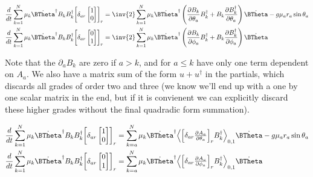 \begin{align}\label{eqn:multiPendulumSpherical2:boo6}
\frac{d}{dt}
\sum_{k=1}^N \mu_k
\dot{\BTheta}^\dagger 
B_k B_k^\dagger 
{\begin{bmatrix}
\delta_{ar}
\begin{bmatrix}
1 \\
0
\end{bmatrix}
\end{bmatrix}}_r
&=
\inv{2} \sum_{k=1}^N \mu_k
\dot{\BTheta}^\dagger 
\left(
\PD{\theta_a}{B_k} B_k^\dagger + B_k \PD{\theta_a}{B_k^\dagger } \right)
\dot{\BTheta} 
-g \mu_a r_a \sin\theta_a \\
\frac{d}{dt}
\sum_{k=1}^N \mu_k
\dot{\BTheta}^\dagger 
B_k B_k^\dagger 
{\begin{bmatrix}
\delta_{ar}
\begin{bmatrix}
0 \\
1 
\end{bmatrix}
\end{bmatrix}}_r
&=
\inv{2} \sum_{k=1}^N \mu_k
\dot{\BTheta}^\dagger 
\left(
\PD{\phi_a}{B_k} B_k^\dagger + B_k \PD{\phi_a}{B_k^\dagger } \right)
\dot{\BTheta} 
\end{align}

Note that the $\partial_a B_k$ are zero if $a > k$, and for $a \le k$ have only one term dependent on $A_a$.  We also have a matrix sum of the form $u + u^\dagger$ in the partials, which discards all grades of order two and three (we know we'll end up with a one by one scalar matrix in the end, but if it is convienent we can explicitly discard these higher grades without the final quadradic form summation).  

\begin{align}\label{eqn:multiPendulumSpherical2:boo7}
\frac{d}{dt}
\sum_{k=1}^N \mu_k
\dot{\BTheta}^\dagger 
B_k B_k^\dagger 
{\begin{bmatrix}
\delta_{ar}
\begin{bmatrix}
1 \\
0
\end{bmatrix}
\end{bmatrix}}_r
&=
\sum_{k=a}^N \mu_k
\dot{\BTheta}^\dagger 
\gpgrade{
{\begin{bmatrix}
\delta_{ar}
\PD{\theta_a}{A_a} \\
\end{bmatrix}}_r
B_k^\dagger }{0,1}
\dot{\BTheta} 
-g \mu_a r_a \sin\theta_a \\
\frac{d}{dt}
\sum_{k=1}^N \mu_k
\dot{\BTheta}^\dagger 
B_k B_k^\dagger 
{\begin{bmatrix}
\delta_{ar}
\begin{bmatrix}
0 \\
1 
\end{bmatrix}
\end{bmatrix}}_r
&=
\sum_{k=a}^N \mu_k
\dot{\BTheta}^\dagger 
\gpgrade{
{\begin{bmatrix}
\delta_{ar}
\PD{\phi_a}{A_a} \\
\end{bmatrix}}_r
B_k^\dagger }{0,1}
\dot{\BTheta} 
\end{align}

